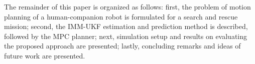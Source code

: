 \documentclass[letterpaper, 10 pt, conference]{ieeeconf}
\newcommand{\todohere}[1]{\hl{(\textbf{TODO:} #1)}}
\begin{document}
	
	
	The remainder of this paper is organized as follows:
	first, the problem of motion planning of a human-companion robot is formulated for a search and rescue mission;
	second, the IMM-UKF estimation and prediction method is described, followed by the MPC planner;
	next, simulation setup and results on evaluating the proposed approach are presented; 
	lastly, concluding remarks and ideas of future work are presented.
	
	
	
\end{document}
